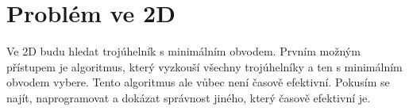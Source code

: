 \chapter{Problém ve 2D}
\label{chap:problem2d}
Ve 2D budu hledat trojúhelník s minimálním obvodem. Prvním možným přístupem je algoritmus, který vyzkouší všechny trojúhelníky a ten s minimálním obvodem vybere. Tento algoritmus ale vůbec není časově efektivní. Pokusím se najít, naprogramovat a dokázat správnost jiného, který časově efektivní je. 




\clearpage
